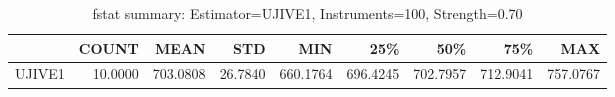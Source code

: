 \begin{table}[ht]
\centering
\caption{fstat summary: Estimator=UJIVE1, Instruments=100, Strength=0.70}
\begin{tabular}{lrrrrrrrr}
\toprule
 & COUNT & MEAN & STD & MIN & 25\% & 50\% & 75\% & MAX \\
\midrule
UJIVE1 & 10.0000 & 703.0808 & 26.7840 & 660.1764 & 696.4245 & 702.7957 & 712.9041 & 757.0767 \\
\bottomrule
\end{tabular}
\end{table}
